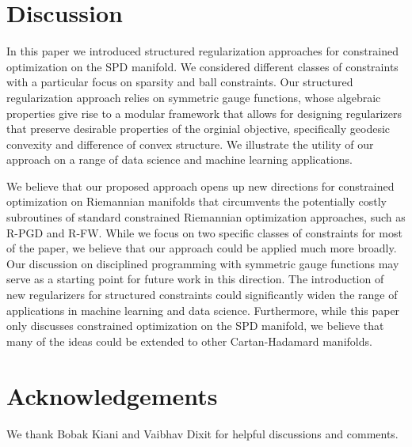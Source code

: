 \documentclass[sn-nature]{sn-jnl}%
\theoremstyle{thmstyleone}%
\theoremstyle{thmstyletwo}%
\theoremstyle{thmstylethree}%
\begin{document}

\section{Discussion}
In this paper we introduced structured regularization approaches for constrained optimization on the SPD manifold. We considered different classes of constraints with a particular focus on sparsity and ball constraints. Our structured regularization approach relies on symmetric gauge functions, whose algebraic properties give rise to a modular framework that allows for designing regularizers that preserve desirable properties of the orginial objective, specifically geodesic convexity and difference of convex structure. We illustrate the utility of our approach on a range of data science and machine learning applications.

We believe that our proposed approach opens up new directions for constrained optimization on Riemannian manifolds that circumvents the potentially costly subroutines of standard constrained Riemannian optimization approaches, such as R-PGD and R-FW. While we focus on two specific classes of constraints for most of the paper, we believe that our approach could be applied much more broadly. Our discussion on disciplined programming with symmetric gauge functions may serve as a starting point for future work in this direction. The introduction of new regularizers for structured constraints could significantly widen the range of applications in machine learning and data science. Furthermore, while this paper only discusses constrained optimization on the SPD manifold, we believe that many of the ideas could be extended to other Cartan-Hadamard manifolds.


\section*{Acknowledgements}
We thank Bobak Kiani and Vaibhav Dixit for helpful discussions and comments.\\ 
\end{document}
